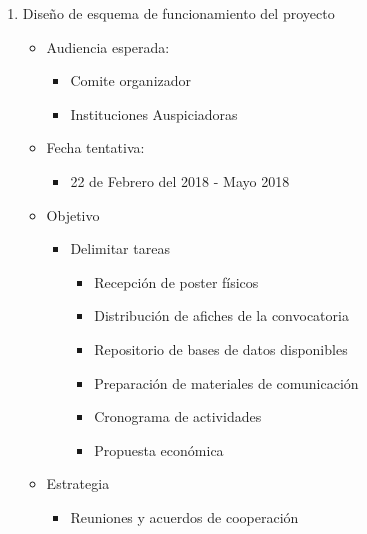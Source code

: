 \documentclass{article}
\begin{document}
\begin{enumerate}
\item Diseño de esquema de funcionamiento del proyecto
\begin{itemize}
\item Audiencia esperada:
\begin{itemize}
\item Comite organizador
\item Instituciones Auspiciadoras
\end{itemize}
\item Fecha tentativa:
\begin{itemize}
\item 22 de Febrero del 2018 - Mayo 2018
\end{itemize}
\item Objetivo
\begin{itemize}
\item Delimitar tareas
\begin{itemize}
\item Recepción de poster físicos
\item Distribución de afiches de la convocatoria
\item Repositorio de bases de datos disponibles
\item Preparación de materiales de comunicación
\item Cronograma de actividades
\item Propuesta económica
\end{itemize}
\end{itemize}
\item Estrategia
\begin{itemize}
\item Reuniones y acuerdos de cooperación
\end{itemize}
\end{itemize}


\end{enumerate}
\end{document}
